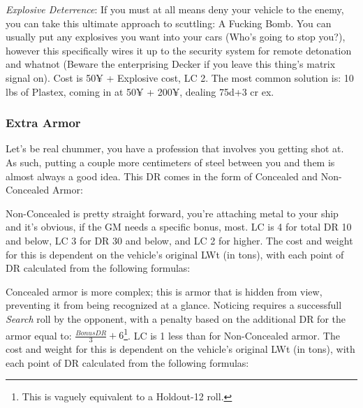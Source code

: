 \begin{multicols*}{2}
	\textit{Explosive Deterrence}: If you must at all means deny your vehicle to the enemy, you can take this ultimate approach to scuttling: A Fucking Bomb. You can usually put any explosives you want into your cars (Who's going to stop you?), however this specifically wires it up to the security system for remote detonation and whatnot (Beware the enterprising Decker if you leave this thing's matrix signal on). Cost is 50¥ + Explosive cost, LC 2. The most common solution is: 10 lbs of Plastex, coming in at 50¥ + 200¥, dealing 75d+3 cr ex.
	
	\subsubsection{Extra Armor}
	
	Let's be real chummer, you have a profession that involves you getting shot at. As such, putting a couple more centimeters of steel between you and them is almost always a good idea. This DR comes in the form of Concealed and Non-Concealed Armor:
	
	Non-Concealed is pretty straight forward, you're attaching metal to your ship and it's obvious, if the GM needs a specific bonus, most. LC is 4 for total DR 10 and below, LC 3 for DR 30 and below, and LC 2 for higher. The cost and weight for this is dependent on the vehicle's original LWt (in tons), with each point of DR calculated from the following formulas:
	

	Concealed armor is more complex; this is armor that is hidden from view, preventing it from being recognized at a glance. Noticing requires a successfull \textit{Search} roll by the opponent, with a penalty based on the additional DR for the armor equal to: $\frac{Bonus DR}{3} + 6$\footnote{This is vaguely equivalent to a Holdout-12 roll.}. LC is 1 less than for Non-Concealed armor. The cost and weight for this is dependent on the vehicle's original LWt (in tons), with each point of DR calculated from the following formulas:
	
\end{multicols*}

